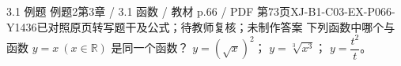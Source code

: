 \par\noindent\begin{minipage}{\linewidth}
\begin{bankitem}{3.1 例题 例题2}{第3章 / 3.1 函数 / 教材 p.66 / PDF 第73页}{XJ-B1-C03-EX-P066-Y1436}{已对照原页转写题干及公式；待教师复核；未制作答案}
下列函数中哪个与函数 $y=x\ (x\in\mathbb R)$ 是同一个函数？
$y=(\sqrt x)^2$；
$y=\sqrt[3]{x^3}$；
$y=\dfrac{t^2}t$。
\end{bankitem}
\end{minipage}\par\medskip
